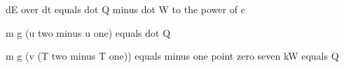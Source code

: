 dE over dt equals dot Q minus dot W to the power of c

m g (u two minus u one) equals dot Q

m g (v (T two minus T one)) equals minus one point zero seven kW equals Q